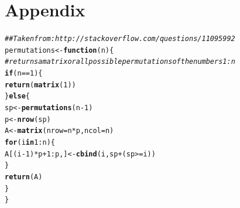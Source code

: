 \documentclass[12pt]{article}\usepackage[]{graphicx}\usepackage[]{color}
\makeatletter
\newcommand{\hlnum}[1]{\textcolor[rgb]{0.686,0.059,0.569}{#1}}%
\newcommand{\hlcom}[1]{\textcolor[rgb]{0.678,0.584,0.686}{\textit{#1}}}%
\newcommand{\hlopt}[1]{\textcolor[rgb]{0,0,0}{#1}}%
\newcommand{\hlstd}[1]{\textcolor[rgb]{0.345,0.345,0.345}{#1}}%
\newcommand{\hlkwa}[1]{\textcolor[rgb]{0.161,0.373,0.58}{\textbf{#1}}}%
\newcommand{\hlkwb}[1]{\textcolor[rgb]{0.69,0.353,0.396}{#1}}%
\newcommand{\hlkwc}[1]{\textcolor[rgb]{0.333,0.667,0.333}{#1}}%
\newcommand{\hlkwd}[1]{\textcolor[rgb]{0.737,0.353,0.396}{\textbf{#1}}}%
\newenvironment{kframe}{%
 \def\at@end@of@kframe{}%
 \ifinner\ifhmode%
  \def\at@end@of@kframe{\end{minipage}}%
  \begin{minipage}{\columnwidth}%
 \fi\fi%
 \def\FrameCommand##1{\hskip\@totalleftmargin \hskip-\fboxsep
 \colorbox{shadecolor}{##1}\hskip-\fboxsep
     \hskip-\linewidth \hskip-\@totalleftmargin \hskip\columnwidth}%
 \MakeFramed {\advance\hsize-\width
   \@totalleftmargin\z@ \linewidth\hsize
   \@setminipage}}%
 {\par\unskip\endMakeFramed%
 \at@end@of@kframe}
\newenvironment{knitrout}{}{} %
\makeatother
\begin{document}
\newpage

\section{Appendix}

\begin{knitrout}
\color{fgcolor}\begin{kframe}
\begin{alltt}
\hlcom{## Taken from: http://stackoverflow.com/questions/11095992}
\hlstd{permutations} \hlkwb{<-} \hlkwa{function}\hlstd{(}\hlkwc{n}\hlstd{)\{}
  \hlcom{#returns a matrix or all possible permutations of the numbers 1:n}
  \hlkwa{if}\hlstd{(n}\hlopt{==}\hlnum{1}\hlstd{)\{}
  \hlkwd{return}\hlstd{(}\hlkwd{matrix}\hlstd{(}\hlnum{1}\hlstd{))}
    \hlstd{\}} \hlkwa{else} \hlstd{\{}
    \hlstd{sp} \hlkwb{<-} \hlkwd{permutations}\hlstd{(n}\hlopt{-}\hlnum{1}\hlstd{)}
    \hlstd{p} \hlkwb{<-} \hlkwd{nrow}\hlstd{(sp)}
    \hlstd{A} \hlkwb{<-} \hlkwd{matrix}\hlstd{(}\hlkwc{nrow}\hlstd{=n}\hlopt{*}\hlstd{p,}\hlkwc{ncol}\hlstd{=n)}
    \hlkwa{for}\hlstd{(i} \hlkwa{in} \hlnum{1}\hlopt{:}\hlstd{n)\{}
      \hlstd{A[(i}\hlopt{-}\hlnum{1}\hlstd{)}\hlopt{*}\hlstd{p}\hlopt{+}\hlnum{1}\hlopt{:}\hlstd{p,]} \hlkwb{<-} \hlkwd{cbind}\hlstd{(i,sp}\hlopt{+}\hlstd{(sp}\hlopt{>=}\hlstd{i))}
    \hlstd{\}}
    \hlkwd{return}\hlstd{(A)}
  \hlstd{\}}
\hlstd{\}}
\end{alltt}
\end{kframe}
\end{knitrout}
\end{document}
